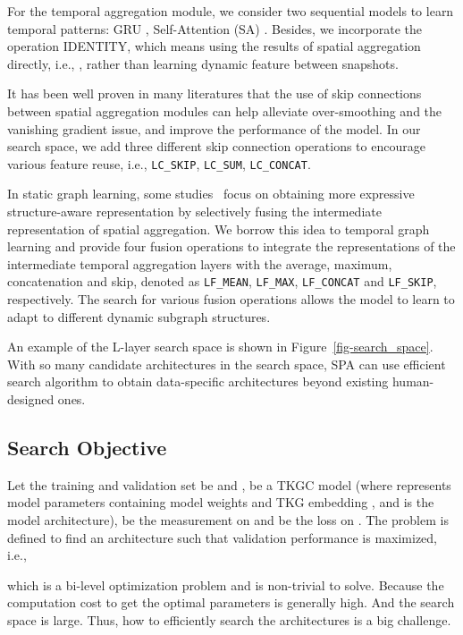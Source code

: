 \documentclass[11pt]{article}
\begin{document}
 For the temporal aggregation module, 
we consider two sequential models to learn temporal patterns: GRU \citep{cho-etal-2014-learning} , Self-Attention (SA) \citep{vaswani2017attention}. 
Besides, 
we incorporate the operation IDENTITY, 
which means using the results of spatial aggregation directly, 
i.e., , 
rather than learning dynamic feature between snapshots. 

 It has been well proven in many literatures \citep{li2021deepgcns} that the use of skip connections between spatial aggregation modules can help alleviate over-smoothing and the vanishing gradient issue, 
and improve the performance of the model. 
In our search space, 
we add three different skip connection operations to encourage various feature reuse, 
i.e., \texttt{LC\_SKIP}, \texttt{LC\_SUM}, \texttt{LC\_CONCAT}. 

 In static graph learning, 
some studies~\citep{xu2018representation} 
focus on obtaining more expressive structure-aware representation 
by selectively fusing the intermediate representation of spatial aggregation. 
We borrow this idea to temporal graph learning and 
provide four fusion operations 
to integrate the representations of the intermediate temporal aggregation layers with 
the average, 
maximum, 
concatenation 
and skip, 
denoted as \texttt{LF\_MEAN}, \texttt{LF\_MAX}, \texttt{LF\_CONCAT} and \texttt{LF\_SKIP}, 
respectively. 
The search for various fusion operations 
allows the model to learn to adapt to different dynamic subgraph structures. 
 
An example of the L-layer search space is shown in Figure~\ref{fig-search_space}.
With so many candidate architectures in the search space, 
SPA can use efficient search algorithm 
to obtain data-specific architectures 
beyond existing human-designed ones.

\subsection{Search Objective}

Let the training and validation set be 
 and ,
 be a TKGC model 
(where  represents model parameters containing model weights  and TKG embedding ,
and  is the model architecture),
 be the measurement on 
and  be the loss on .
The problem is defined to find an architecture  
such that validation performance is maximized, i.e.,

which is a bi-level optimization problem and is non-trivial to solve. 
Because the computation cost to get the optimal parameters  is generally high.
And the search space is large.
Thus, 
how to efficiently search the architectures is a big challenge.
\end{document}
